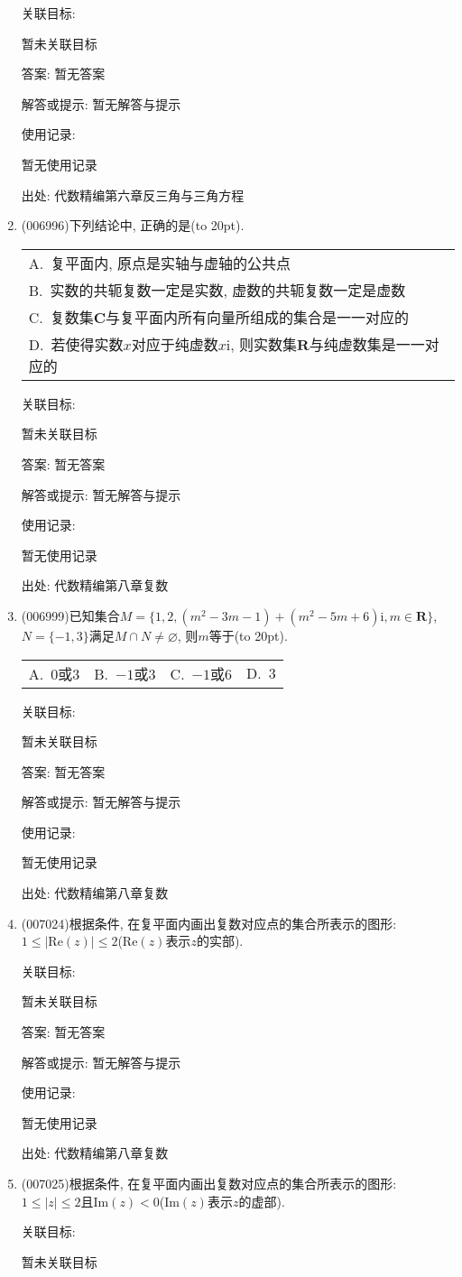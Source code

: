 \documentclass[10pt,a4paper]{article}
\newcommand{\bracket}[1]{(\hbox to #1pt{})}
\newcommand{\onech}[4]{\par\begin{tabular}{p{.9\textwidth}}
A.~#1\\
B.~#2\\
C.~#3\\
D.~#4
\end{tabular}}
\newcommand{\fourch}[4]{\par\begin{tabular}{p{.23\textwidth}p{.23\textwidth}p{.23\textwidth}p{.23\textwidth}}
A.~#1 &B.~#2& C.~#3& D.~#4
\end{tabular}}
\begin{document}
\begin{enumerate}[1.]
关联目标:

暂未关联目标

答案: 暂无答案

解答或提示: 暂无解答与提示

使用记录:

暂无使用记录


出处: 代数精编第六章反三角与三角方程
\item { (006996)}下列结论中, 正确的是\bracket{20}.
\onech{复平面内, 原点是实轴与虚轴的公共点}{实数的共轭复数一定是实数, 虚数的共轭复数一定是虚数}{复数集$\mathbf{C}$与复平面内所有向量所组成的集合是一一对应的}{若使得实数$x$对应于纯虚数$x\mathrm{i}$, 则实数集$\mathbf{R}$与纯虚数集是一一对应的}


关联目标:

暂未关联目标

答案: 暂无答案

解答或提示: 暂无解答与提示

使用记录:

暂无使用记录


出处: 代数精编第八章复数
\item { (006999)}已知集合$M=\{1,2,(m^2-3m-1)+(m^2-5m+6)\mathrm{i},m\in \mathbf{R}\}$, $N=\{-1,3\}$满足$M\cap N\ne \varnothing$, 则$m$等于\bracket{20}.
\fourch{$0$或$3$}{$-1$或$3$}{$-1$或$6$}{$3$}


关联目标:

暂未关联目标

答案: 暂无答案

解答或提示: 暂无解答与提示

使用记录:

暂无使用记录


出处: 代数精编第八章复数
\item { (007024)}根据条件, 在复平面内画出复数对应点的集合所表示的图形: $1\le|\mathrm{Re}(z)|\le 2$($\mathrm{Re}(z)$表示$z$的实部).


关联目标:

暂未关联目标

答案: 暂无答案

解答或提示: 暂无解答与提示

使用记录:

暂无使用记录


出处: 代数精编第八章复数
\item { (007025)}根据条件, 在复平面内画出复数对应点的集合所表示的图形: $1\le|z|\le 2$且$\mathrm{Im}(z)<0$($\mathrm{Im}(z)$表示$z$的虚部).


关联目标:

暂未关联目标


\end{enumerate}
\end{document}
